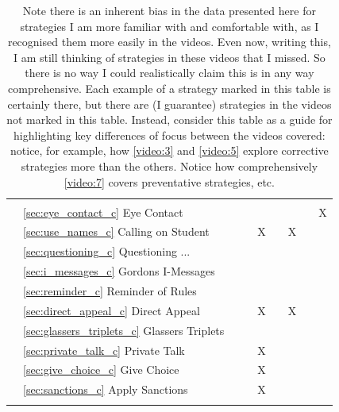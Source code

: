 \documentclass[12pt]{report}
\begin{document}
\begin{longtable}{rl|c|c|c|c|c|c|c|}
 & & & & & & & & \\ 
\parbox[t]{2mm}{}
& \ref{sec:eye_contact_c} Eye Contact                                & & & & & & &X\\
& \ref{sec:use_names_c} Calling on Student                                  & & &X& &X& & \\
& \ref{sec:questioning_c} Questioning ...                                & & & & & & & \\
& \ref{sec:i_messages_c} Gordons I-Messages                                 & & & & & & & \\
& \ref{sec:reminder_c} Reminder of Rules                                   & & & & & & & \\
& \ref{sec:direct_appeal_c} Direct Appeal                              & & &X& &X& & \\
& \ref{sec:glassers_triplets_c} Glassers Triplets                          & & & & & & & \\
& \ref{sec:private_talk_c} Private Talk                               & & &X& & & & \\
& \ref{sec:give_choice_c} Give Choice                                & & &X& & & & \\
& \ref{sec:sanctions_c} Apply Sanctions                                  & & &X& & & & \\
\hline 
\caption{Note there is an inherent bias in the data presented here for strategies I am more familiar with and comfortable with, as I recognised them more easily in the videos. Even now, writing this, I am still thinking of strategies in these videos that I missed. So there is no way I could realistically claim this is in any way comprehensive. Each example of a strategy marked in this table is certainly there, but there are (I guarantee) strategies in the videos not marked in this table. Instead, consider this table as a guide for highlighting key differences of focus between the videos covered: notice, for example, how \ref{video:3} and \ref{video:5} explore corrective strategies more than the others. Notice how comprehensively \ref{video:7} covers preventative strategies, etc.
\label{tab:videos}}

\end{longtable}
\end{document}
